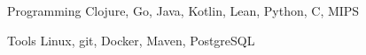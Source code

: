 

\begin{cvskills}

  \cvskill
    {Programming} %
    {Clojure, Go, Java, Kotlin, Lean, Python, C, MIPS} %

  \cvskill
    {Tools} %
    {Linux, git, Docker, Maven, PostgreSQL} %
\end{cvskills}
